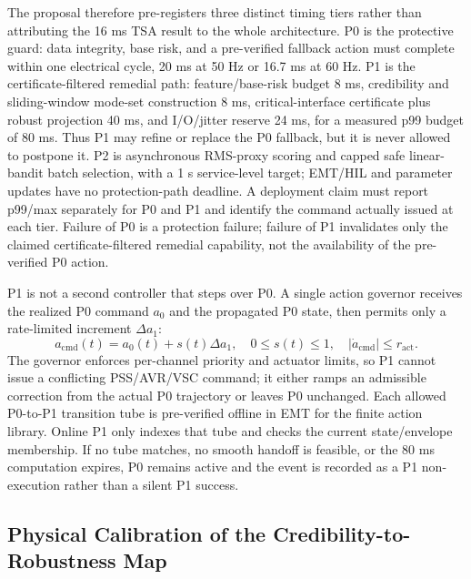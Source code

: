 \documentclass[conference]{IEEEtran}
\begin{document}
The proposal therefore pre-registers three distinct timing tiers rather than attributing the 16 ms TSA result to the whole architecture. P0 is the protective guard: data integrity, base risk, and a pre-verified fallback action must complete within one electrical cycle, 20 ms at 50 Hz or 16.7 ms at 60 Hz. P1 is the certificate-filtered remedial path: feature/base-risk budget 8 ms, credibility and sliding-window mode-set construction 8 ms, critical-interface certificate plus robust projection 40 ms, and I/O/jitter reserve 24 ms, for a measured p99 budget of 80 ms. Thus P1 may refine or replace the P0 fallback, but it is never allowed to postpone it. P2 is asynchronous RMS-proxy scoring and capped safe linear-bandit batch selection, with a 1 s service-level target; EMT/HIL and parameter updates have no protection-path deadline. A deployment claim must report p99/max separately for P0 and P1 and identify the command actually issued at each tier. Failure of P0 is a protection failure; failure of P1 invalidates only the claimed certificate-filtered remedial capability, not the availability of the pre-verified P0 action.

P1 is not a second controller that steps over P0. A single action governor receives the realized P0 command $a_0$ and the propagated P0 state, then permits only a rate-limited increment $\Delta a_1$:
\begin{equation}
a_{\mathrm{cmd}}(t)=a_0(t)+s(t)\Delta a_1,
\quad 0\leq s(t)\leq1,
\quad |\dot a_{\mathrm{cmd}}|\leq r_{\mathrm{act}}.
\label{eq:handoff}
\end{equation}
The governor enforces per-channel priority and actuator limits, so P1 cannot issue a conflicting PSS/AVR/VSC command; it either ramps an admissible correction from the actual P0 trajectory or leaves P0 unchanged. Each allowed P0-to-P1 transition tube is pre-verified offline in EMT for the finite action library. Online P1 only indexes that tube and checks the current state/envelope membership. If no tube matches, no smooth handoff is feasible, or the 80 ms computation expires, P0 remains active and the event is recorded as a P1 non-execution rather than a silent P1 success.

\subsection{Physical Calibration of the Credibility-to-Robustness Map}
\end{document}
